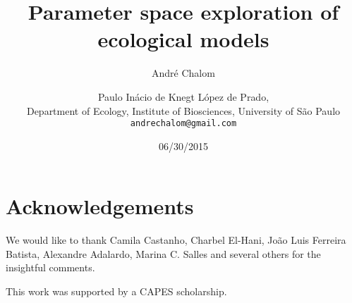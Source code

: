 \documentclass[twoside,12pt,a4paper]{article}
\begin{document}

\title{Parameter space exploration of ecological models}
\author{Andr\'e Chalom \and Paulo In\'acio de Knegt L\'opez de Prado,\\
  Department of Ecology, Institute of Biosciences, University of São Paulo \\
  \texttt{andrechalom@gmail.com}
  }
\date{06/30/2015}
\maketitle



\newpage
\tableofcontents
\newpage






\newpage


\section*{Acknowledgements}
We would like to thank Camila Castanho, Charbel El-Hani, Jo\~ao Luis Ferreira Batista, Alexandre Adalardo,
Marina C. Salles and several others for the insightful comments.

This work was supported by a CAPES scholarship.

\newpage


\end{document}
